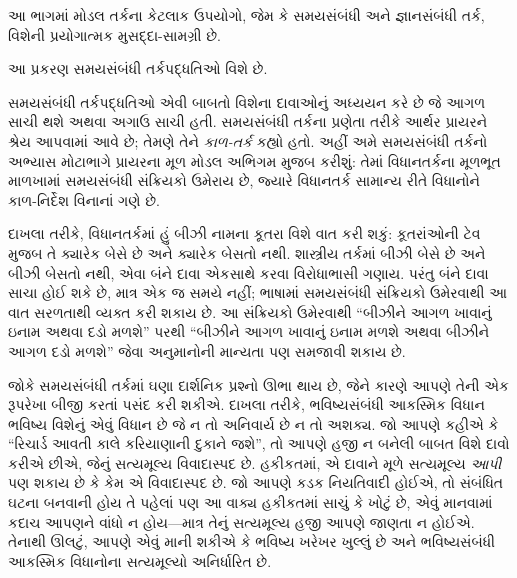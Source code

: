 
\label{guunit:OLP-0475}


\begin{editorial}
આ ભાગમાં મોડલ તર્કના કેટલાક ઉપયોગો, જેમ કે સમયસંબંધી અને
જ્ઞાનસંબંધી તર્ક, વિશેની પ્રયોગાત્મક મુસદ્દા-સામગ્રી છે.
\end{editorial}

\begingroup
\makeatletter{}\makeatother

\label{guunit:OLP-0476}


\begin{editorial}
  આ પ્રકરણ સમયસંબંધી તર્કપદ્ધતિઓ વિશે છે.
\end{editorial}

\begingroup
\makeatletter{}\makeatother


\label{guunit:OLP-0477}


સમયસંબંધી તર્કપદ્ધતિઓ એવી બાબતો વિશેના દાવાઓનું અધ્યયન કરે છે જે
આગળ સાચી થશે અથવા અગાઉ સાચી હતી. સમયસંબંધી તર્કના પ્રણેતા તરીકે
આર્થર પ્રાયરને શ્રેય આપવામાં આવે છે; તેમણે તેને \emph{કાળ-તર્ક}
કહ્યો હતો. અહીં અમે સમયસંબંધી તર્કનો અભ્યાસ મોટાભાગે પ્રાયરના મૂળ
મોડલ અભિગમ મુજબ કરીશું: તેમાં વિધાનતર્કના મૂળભૂત માળખામાં
સમયસંબંધી સંક્રિયકો ઉમેરાય છે, જ્યારે વિધાનતર્ક સામાન્ય રીતે
વિધાનોને કાળ-નિર્દેશ વિનાનાં ગણે છે.

દાખલા તરીકે, વિધાનતર્કમાં હું બીઝી નામના કૂતરા વિશે વાત કરી શકું:
કૂતરાંઓની ટેવ મુજબ તે ક્યારેક બેસે છે અને ક્યારેક બેસતો નથી.
શાસ્ત્રીય તર્કમાં બીઝી બેસે છે અને બીઝી બેસતો નથી, એવા બંને દાવા
એકસાથે કરવા વિરોધાભાસી ગણાય. પરંતુ બંને દાવા સાચા હોઈ શકે છે,
માત્ર એક જ સમયે નહીં; ભાષામાં સમયસંબંધી સંક્રિયકો ઉમેરવાથી આ વાત
સરળતાથી વ્યક્ત કરી શકાય છે. આ સંક્રિયકો ઉમેરવાથી ``બીઝીને આગળ
ખાવાનું ઇનામ અથવા દડો મળશે'' પરથી ``બીઝીને આગળ ખાવાનું ઇનામ
મળશે અથવા બીઝીને આગળ દડો મળશે'' જેવા અનુમાનોની માન્યતા પણ
સમજાવી શકાય છે.

જોકે સમયસંબંધી તર્કમાં ઘણા દાર્શનિક પ્રશ્નો ઊભા થાય છે, જેને કારણે
આપણે તેની એક રૂપરેખા બીજી કરતાં પસંદ કરી શકીએ. દાખલા તરીકે,
ભવિષ્યસંબંધી આકસ્મિક વિધાન ભવિષ્ય વિશેનું એવું વિધાન છે જે ન તો
અનિવાર્ય છે ન તો અશક્ય. જો આપણે કહીએ કે ``રિચાર્ડ આવતી કાલે
કરિયાણાની દુકાને જશે'', તો આપણે હજી ન બનેલી બાબત વિશે દાવો કરીએ
છીએ, જેનું સત્યમૂલ્ય વિવાદાસ્પદ છે. હકીકતમાં, એ દાવાને મૂળે
સત્યમૂલ્ય \emph{આપી} પણ શકાય છે કે કેમ એ વિવાદાસ્પદ છે. જો આપણે
કડક નિયતિવાદી હોઈએ, તો સંબંધિત ઘટના બનવાની હોય તે પહેલાં પણ આ
વાક્ય હકીકતમાં સાચું કે ખોટું છે, એવું માનવામાં કદાચ આપણને વાંધો
ન હોય---માત્ર તેનું સત્યમૂલ્ય હજી આપણે જાણતા ન હોઈએ. તેનાથી
ઊલટું, આપણે એવું માની શકીએ કે ભવિષ્ય ખરેખર ખુલ્લું છે અને
ભવિષ્યસંબંધી આકસ્મિક વિધાનોના સત્યમૂલ્યો અનિર્ધારિત છે.


